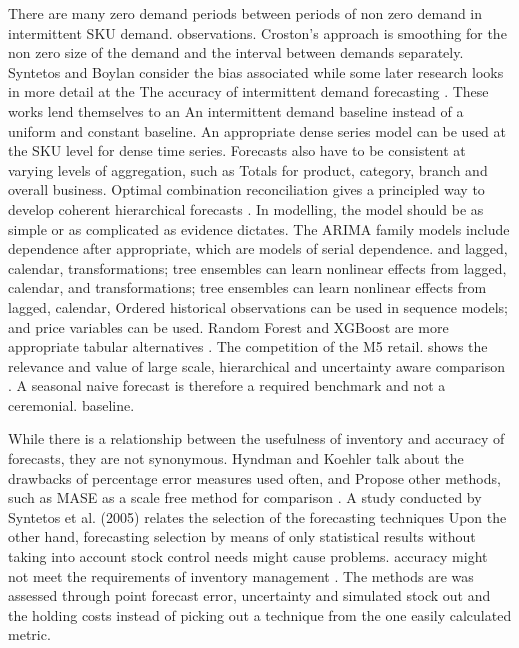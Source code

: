 \documentclass[a4paper,11pt,oneside]{book}
\theoremstyle{plain}
\theoremstyle{definition}
\theoremstyle{remark}
\begin{document}
There are many zero demand periods between periods of non zero demand in intermittent SKU demand. observations. Croston's approach is smoothing for the non zero size of the demand and the interval between demands separately. Syntetos and Boylan \cite{SyntetosBoylan2000bias} consider the bias associated while some later research looks in more detail at the The accuracy of intermittent demand forecasting \cite{syntetos2005intermittent}. These works lend themselves to an An intermittent demand baseline instead of a uniform and constant baseline. An appropriate dense series model can be used at the SKU level for dense time series. Forecasts also have to be consistent at varying levels of aggregation, such as Totals for product, category, branch and overall business. Optimal combination reconciliation gives a principled way to develop coherent hierarchical forecasts \cite{hyndman2011hierarchical}. In modelling, the model should be as simple or as complicated as evidence dictates. The ARIMA family models include dependence after appropriate, which are models of serial dependence. and lagged, calendar, transformations; tree ensembles can learn nonlinear effects from lagged, calendar, and transformations; tree ensembles can learn nonlinear effects from lagged, calendar, Ordered historical observations can be used in sequence models; and price variables can be used. Random Forest and XGBoost are more appropriate tabular alternatives \cite{breiman2001rf,chen2016xgboost}. The competition of the M5 retail. shows the relevance and value of large scale, hierarchical and uncertainty aware comparison \cite{makridakis2022m5}. A seasonal naive forecast is therefore a required benchmark and not a ceremonial. baseline.

While there is a relationship between the usefulness of inventory and accuracy of forecasts, they are not synonymous. Hyndman and Koehler talk about the drawbacks of percentage error measures used often, and Propose other methods, such as MASE as a scale free method for comparison \cite{hyndman2006accuracy}. A study conducted by Syntetos et al. (2005) relates the selection of the forecasting techniques Upon the other hand, forecasting selection by means of only statistical results without taking into account stock control needs might cause problems. accuracy might not meet the requirements of inventory management \cite{syntetos2010stock}. The methods are was assessed through point forecast error, uncertainty and simulated stock out and the holding costs instead of picking out a technique from the one easily calculated metric.
\end{document}
